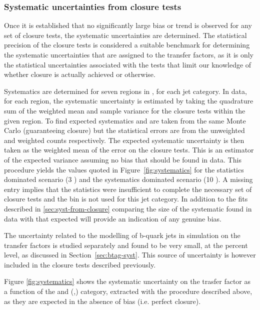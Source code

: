 \subsubsection{Systematic uncertainties from closure tests\label{sec:syst-from-closure}}

Once it is established that no significantly large bias or trend is
observed for any set of closure tests, the systematic uncertainties
are determined. The statistical precision of the closure tests is
considered a suitable benchmark for determining the systematic
uncertainties that are assigned to the transfer factors, as it is only
the statistical uncertainties associated with the tests that limit our
knowledge of whether closure is actually achieved or otherwise.

Systematics are determined for seven regions in \scalht,
for each jet category. In data, for each \scalht region, the systematic uncertainty 
is estimated by taking the quadrature sum of the weighted mean and sample variance for 
the closure tests within the given \scalht region. To find expected systematics \nobs and \npre are 
taken from the same Monte Carlo (guaranteeing closure) but the statistical errors are 
from the unweighted and weighted counts respectively. The expected systematic uncertainty is then 
taken as the weighted mean of the error on the closure tests. This is an estimator of the expected variance
assuming no bias that should be found in data. 
This procedure yields the values quoted in Figure~\ref{fig:systematics} for the statistics
dominated scenario (3 \ifb) and the systematics dominated scenario (10 \ifb). 
A missing entry implies that the statistics were insufficient to complete the 
necessary set of closure tests and the \scalht bin is not used for this jet category. 
In addition to the fits described in \ref{sec:syst-from-closure} comparing the 
size of the systematic found in data with that expected will provide 
an indication of any genuine bias.

The uncertainty related to the modelling of b-quark jets
in simulation on the transfer factors is studied separately and 
found to be very small, at the percent level, as discussed in Section~\ref{sec:btag-syst}. 
This source of uncertainty is however included in the closure tests described previously.


Figure \ref{fig:systematics} shows the systematic uncertainty on the trasfer factor as a function of the \HT and (\nb,\njet) category, 
extracted with the procedure described above, as they are expected in the absence of bias (i.e. perfect closure).

